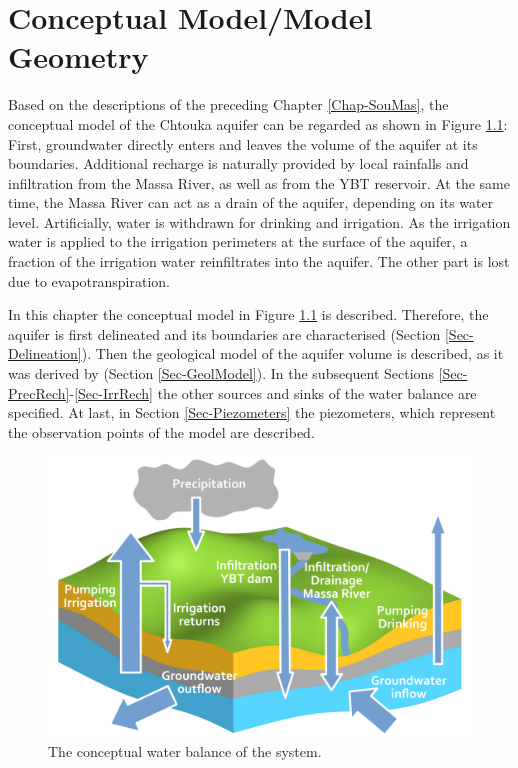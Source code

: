 
\chapter{Conceptual Model/Model Geometry}
\label{Chap-ConcMod}

Based on the descriptions of the preceding Chapter \ref{Chap-SouMas}, the conceptual model of the Chtouka aquifer can be regarded as shown in Figure \ref{Fig-SchemeBalance}: First, groundwater directly enters and leaves the volume of the aquifer at its boundaries. 
Additional recharge is naturally provided by local rainfalls and infiltration from the Massa River, as well as from the YBT reservoir. 
At the same time, the Massa River can act as a drain of the aquifer, depending on its water level. 
Artificially, water is withdrawn for drinking and irrigation. 
As the irrigation water is applied to the irrigation perimeters at the surface of the aquifer, a fraction of the irrigation water reinfiltrates into the aquifer. 
The other part is lost due to evapotranspiration.

In this chapter the conceptual model in Figure \ref{Fig-SchemeBalance} is described. 
Therefore, the aquifer is first delineated and its boundaries are characterised (Section \ref{Sec-Delineation}). 
Then the geological model of the aquifer volume is described, as it was derived by \textcite{Horn.2021} (Section \ref{Sec-GeolModel}). 
In the subsequent Sections \ref{Sec-PrecRech}-\ref{Sec-IrrRech} the other sources and sinks of the water balance are specified. 
At last, in Section \ref{Sec-Piezometers} the piezometers, which represent the observation points of the model are described.

\begin{figure}[h]
    \centering
    \includegraphics[width=1.0\textwidth]{./img/Fig-SchematicBalanceSystem.pdf}
    \caption{The conceptual water balance of the system.}
    \label{Fig-SchemeBalance}
\end{figure}

